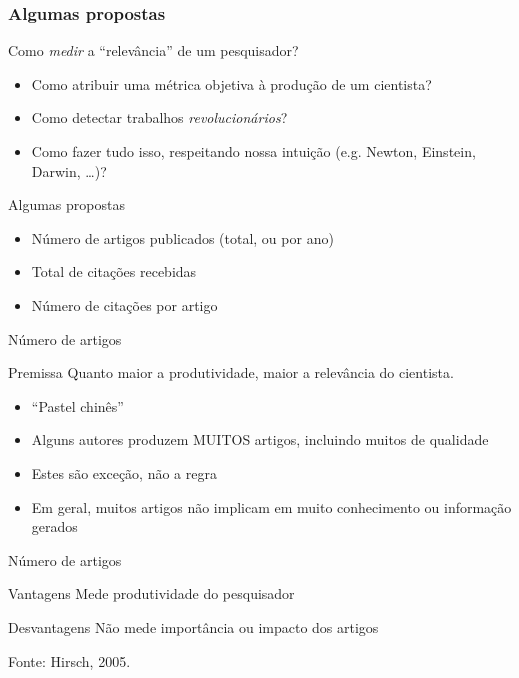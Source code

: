 \documentclass{beamer}
\begin{document}
\subsubsection{Algumas propostas}

\begin{frame}{Como {\em medir} a ``relevância'' de um pesquisador?}
  \begin{itemize}
    \small
  \item Como atribuir uma métrica objetiva à produção de um cientista?
    \bigskip
  \item Como detectar trabalhos {\em revolucionários}?
    \bigskip
  \item Como fazer tudo isso, respeitando nossa intuição (e.g. Newton, Einstein, Darwin, \ldots)?
  \end{itemize}
\end{frame}

\begin{frame}{Algumas propostas}
  \begin{itemize}
    \small
  \item Número de artigos publicados (total, ou por ano)
    \bigskip
  \item Total de citações recebidas
    \bigskip
  \item Número de citações por artigo
  \end{itemize}
\end{frame}

\begin{frame}{Número de artigos}
  \begin{block}{Premissa}
    Quanto maior a produtividade, maior a relevância do cientista.
  \end{block}
  \bigskip
  \bigskip
  \begin{itemize}
    \footnotesize
  \item ``Pastel chinês''
  \item Alguns autores produzem MUITOS artigos, incluindo muitos de qualidade
  \item Estes são exceção, não a regra
  \item Em geral, muitos artigos não implicam em muito conhecimento ou informação gerados
  \end{itemize}
\end{frame}

\begin{frame}{Número de artigos}
  \begin{block}{Vantagens}
    Mede produtividade do pesquisador
  \end{block}
  \bigskip
  \begin{block}{Desvantagens}
    Não mede importância ou impacto dos artigos
  \end{block}

  \vfill
  \footnotesize
  \hfill Fonte: Hirsch, 2005.
\end{frame}
\end{document}
